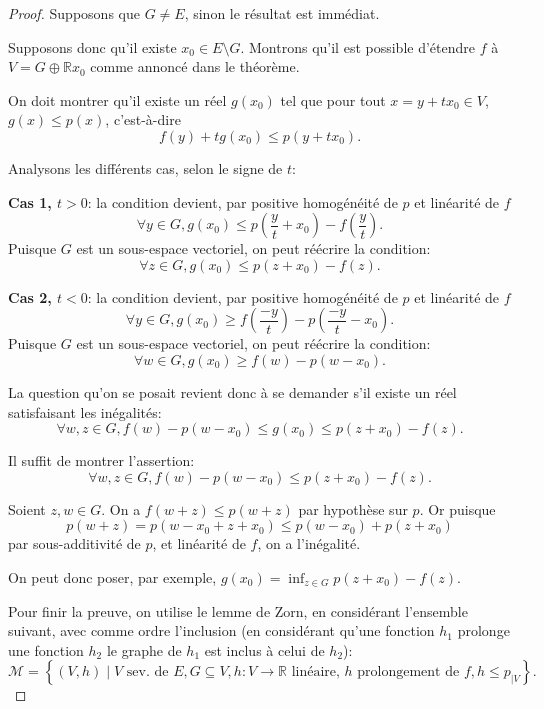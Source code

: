 \begin{proof}
  Supposons que $G\neq E$, sinon le résultat est immédiat.

  Supposons donc qu'il existe $x_0\in E\setminus G$. Montrons
  qu'il est possible d'étendre $f$ à $V = G\oplus \mathbb{R}x_0$
  comme annoncé dans le théorème.

  On doit montrer qu'il existe un réel $g(x_0)$ tel que pour
  tout $x = y+tx_0\in V$, $g(x)\leq p(x)$, c'est-à-dire
  $$f(y) + t g(x_0)\leq p(y + tx_0).$$

  Analysons les différents cas, selon le signe de $t$:

  \textbf{Cas 1, $t>0$}: la condition devient, par positive
  homogénéité de $p$ et linéarité de $f$
  $$\forall y\in G, g(x_0)\leq p\left(\frac{y}{t} + x_0\right)
  - f\left(\frac{y}{t}\right).$$
  Puisque $G$ est un sous-espace vectoriel, on peut réécrire la
  condition:
  $$\forall z\in G, g(x_0)\leq p(z + x_0) - f(z).$$

  \textbf{Cas 2, $t<0$}: la condition devient, par positive
  homogénéité de $p$ et linéarité de $f$
  $$\forall y\in G, g(x_0)\geq  f\left(\frac{-y}{t}\right)
  - p\left(\frac{-y}{t} - x_0\right).$$
  Puisque $G$ est un sous-espace vectoriel, on peut réécrire la
  condition:
  $$\forall w\in G, g(x_0)\geq f(w) - p(w - x_0).$$

  La question qu'on se posait revient donc à se demander s'il existe
  un réel satisfaisant les inégalités:
  $$\forall w, z\in G, f(w) - p(w - x_0)\leq g(x_0)\leq p(z + x_0) - f(z).$$

  Il suffit de montrer l'assertion:
  $$\forall w, z\in G, f(w) - p(w - x_0)\leq p(z + x_0) - f(z).$$

  Soient $z, w\in G$. On a $f(w + z)\leq p(w+z)$ par hypothèse
  sur $p$. Or puisque $$p(w + z)= p(w - x_0 + z +x_0)
  \leq p(w - x_0) + p(z + x_0)$$ par sous-additivité de $p$,
  et linéarité de $f$, on a l'inégalité.

  On peut donc poser, par exemple,
  $g(x_0)=\inf_{z\in G}p(z+x_0)-f(z)$.

  Pour finir la preuve, on utilise le lemme de Zorn, en considérant
  l'ensemble suivant, avec comme ordre l'inclusion (en considérant
  qu'une fonction $h_1$ prolonge une fonction $h_2$ \ssi{} le
  graphe de $h_1$ est inclus à celui de $h_2$):
  $$\mathcal{M}= \left\{(V, h)\mid  V\mbox{ sev. de $E$}, G\subseteq V,
    h: V\to\mathbb{R} \mbox{ linéaire, $h$ prolongement de $f$},
    h\leq p_{|V}\right\}.$$
\end{proof}

